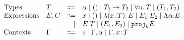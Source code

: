 \[
\begin{array}{llrl}
  \text{Types}       & T    & \Coloneqq & \alpha \mid () \mid {T_1} \to {T_2} \mid \forall \alpha. \, T \mid (T_1, T_2) \\ 
  \text{Expressions} & E, C & \Coloneqq & x \mid () \mid \lambda (x \!:\! T).\, E \mid E_1 \; E_2 \mid \Lambda \alpha. E \\ 
                     &      & \mid      & E \; T \mid (E_1, E_2) \mid {\texttt {proj}}_{k} E \\
  \text{Contexts} & \Gamma & \Coloneqq & \epsilon \mid \Gamma, \alpha \mid \Gamma, x \!:\! T \\
\end{array}
\]
